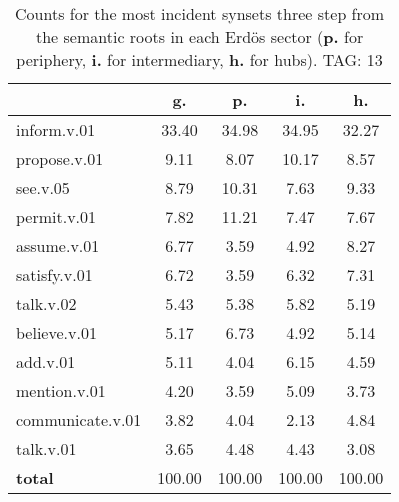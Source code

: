 \begin{table}[h!]
\begin{center}
\begin{tabular}{| l || c | c | c | c |}\hline
 & {\bf g.} & {\bf p.} & {\bf i.} & {\bf h.} \\\hline\hline
inform.v.01 & 33.40  & 34.98  & 34.95  & 32.27 \\\hline
propose.v.01 & 9.11  & 8.07  & 10.17  & 8.57 \\\hline
see.v.05 & 8.79  & 10.31  & 7.63  & 9.33 \\\hline
permit.v.01 & 7.82  & 11.21  & 7.47  & 7.67 \\\hline
assume.v.01 & 6.77  & 3.59  & 4.92  & 8.27 \\\hline
satisfy.v.01 & 6.72  & 3.59  & 6.32  & 7.31 \\\hline
talk.v.02 & 5.43  & 5.38  & 5.82  & 5.19 \\\hline
believe.v.01 & 5.17  & 6.73  & 4.92  & 5.14 \\\hline
add.v.01 & 5.11  & 4.04  & 6.15  & 4.59 \\\hline
mention.v.01 & 4.20  & 3.59  & 5.09  & 3.73 \\\hline
communicate.v.01 & 3.82  & 4.04  & 2.13  & 4.84 \\\hline
talk.v.01 & 3.65  & 4.48  & 4.43  & 3.08 \\\hline\hline
{{\bf total}} & 100.00  & 100.00  & 100.00  & 100.00 \\\hline
\end{tabular}
\caption{Counts for the most incident synsets three step from the semantic roots in each Erd\"os sector ({\bf p.} for periphery, {\bf i.} for intermediary, {\bf h.} for hubs). TAG: 13}
\end{center}
\end{table}
